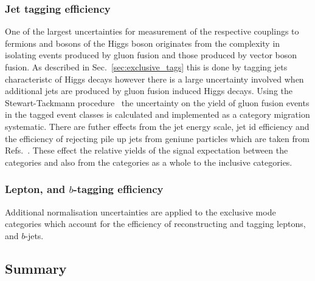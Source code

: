 \subsubsection{Jet tagging efficiency}

One of the largest uncertainties for measurement of the respective couplings to fermions and bosons of the Higgs boson originates from the complexity in isolating events produced by gluon fusion and those produced by vector boson fusion. As described in Sec.~\ref{sec:exclusive_tags} this is done by tagging jets characteristc of \VBF Higgs decays however there is a large uncertainty involved when additional jets are produced by gluon fusion induced Higgs decays. Using the Stewart-Tackmann procedure~\cite{vbf_syst} the uncertainty on the yield of gluon fusion events in the \VBF tagged event classes is calculated and implemented as a category migration systematic. There are futher effects from the jet energy scale, jet id efficiency and the efficiency of rejecting pile up jets from geniune particles which are taken from Refs.~\cite{jet_energy_corrections,jet_energy_corrs2}. These effect the relative yields of the signal expectation between the \VBF categories and also from the \VBF categories as a whole to the inclusive categories.  

\subsubsection{Lepton, \MET and $b$-tagging efficiency}
Additional normalisation uncertainties are applied to the exclusive mode categories which account for the efficiency of reconstructing and tagging leptons, \MET and $b$-jets.

\subsection{Summary}

